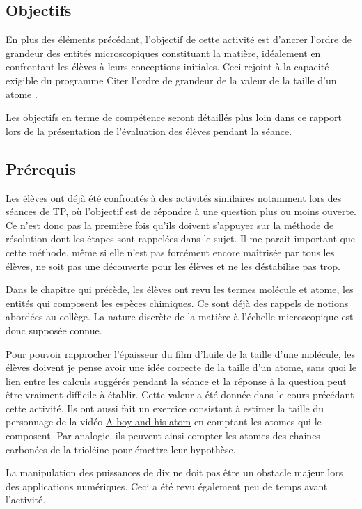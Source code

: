 \documentclass[12pt,a4paper]{article}
\begin{document}
\subsection{Objectifs}

En plus des éléments précédant, l'objectif de cette activité est d'ancrer l'ordre de grandeur des entités microscopiques constituant la matière, idéalement en confrontant les élèves à leurs conceptions initiales.
Ceci rejoint à la capacité exigible du programme \og Citer l'ordre de grandeur de la valeur de la taille d'un atome \fg{}.

Les objectifs en terme de compétence seront détaillés plus loin dans ce rapport lors de la présentation de l'évaluation des élèves pendant la séance.

\subsection{Prérequis}

Les élèves ont déjà été confrontés à des activités similaires notamment lors des séances de TP, où l'objectif est de répondre à une question plus ou moins ouverte.
Ce n'est donc pas la première fois qu'ils doivent s'appuyer sur la méthode de résolution dont les étapes sont rappelées dans le sujet.
Il me parait important que cette méthode, même si elle n'est pas forcément encore maîtrisée par tous les élèves, ne soit pas une découverte pour les élèves et ne les déstabilise pas trop.

Dans le chapitre qui précède, les élèves ont revu les termes molécule et atome, les entités qui composent les espèces chimiques.
Ce sont déjà des rappels de notions abordées au collège.
La nature discrète de la matière à l'échelle microscopique est donc supposée connue.

Pour pouvoir rapprocher l'épaisseur du film d'huile de la taille d'une molécule, les élèves doivent je pense avoir une idée correcte de la taille d'un atome, sans quoi le lien entre les calculs suggérés pendant la séance et la réponse à la question peut être vraiment difficile à établir.
Cette valeur a été donnée dans le cours précédant cette activité.
Ils ont aussi fait un exercice consistant à estimer la taille du personnage de la vidéo \href{https://youtu.be/oSCX78-8-q0}{A boy and his atom} en comptant les \og atomes \fg{} qui le composent.
Par analogie, ils peuvent ainsi compter les atomes des chaines carbonées de la trioléine pour émettre leur hypothèse.

La manipulation des puissances de dix ne doit pas être un obstacle majeur lors des applications numériques.
Ceci a été revu également peu de temps avant l'activité.
\end{document}
